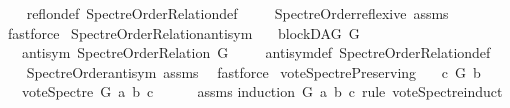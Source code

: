 \begin{isabellebody}
%
\isadelimproof
\ \ %
\endisadelimproof
%
\isatagproof
{}\isamarkupfalse%
\ refl{\isacharunderscore}{\kern0pt}on{\isacharunderscore}{\kern0pt}def\ Spectre{\isacharunderscore}{\kern0pt}Order{\isacharunderscore}{\kern0pt}Relation{\isacharunderscore}{\kern0pt}def\ \isanewline
\ \ \isamarkupfalse%
\ Spectre{\isacharunderscore}{\kern0pt}Order{\isacharunderscore}{\kern0pt}reflexive\ assms\ \isamarkupfalse%
\ fastforce%
\endisatagproof
{\isafoldproof}%
%
\isadelimproof
\isanewline
%
\endisadelimproof
\isanewline
{}\isamarkupfalse%
\ Spectre{\isacharunderscore}{\kern0pt}Order{\isacharunderscore}{\kern0pt}Relation{\isacharunderscore}{\kern0pt}antisym{\isacharcolon}{\kern0pt}\isanewline
\ \ \ {\isachardoublequoteopen}blockDAG\ G{\isachardoublequoteclose}\isanewline
\ \ \ {\isachardoublequoteopen}antisym\ {\isacharparenleft}{\kern0pt}Spectre{\isacharunderscore}{\kern0pt}Order{\isacharunderscore}{\kern0pt}Relation\ G{\isacharparenright}{\kern0pt}{\isachardoublequoteclose}\ \isanewline
%
\isadelimproof
\ \ %
\endisadelimproof
%
\isatagproof
{}\isamarkupfalse%
\ antisym{\isacharunderscore}{\kern0pt}def\ Spectre{\isacharunderscore}{\kern0pt}Order{\isacharunderscore}{\kern0pt}Relation{\isacharunderscore}{\kern0pt}def\ \isanewline
\ \ \isamarkupfalse%
\ Spectre{\isacharunderscore}{\kern0pt}Order{\isacharunderscore}{\kern0pt}antisym\ assms\ \isamarkupfalse%
\ fastforce%
\endisatagproof
{\isafoldproof}%
%
\isadelimproof
\isanewline
%
\endisadelimproof
\isanewline
\isanewline
{}\isamarkupfalse%
\ vote{\isacharunderscore}{\kern0pt}Spectre{\isacharunderscore}{\kern0pt}Preserving{\isacharcolon}{\kern0pt}\isanewline
\ \ \ {\isachardoublequoteopen}c\ {\isasymrightarrow}\isactrlsup {\isacharplus}{\kern0pt}\isactrlbsub G\isactrlesub \ b{\isachardoublequoteclose}\isanewline
\ \ \ {\isachardoublequoteopen}vote{\isacharunderscore}{\kern0pt}Spectre\ G\ a\ b\ c\ {\isasymin}\ {\isacharbraceleft}{\kern0pt}{}{\isacharcomma}{\kern0pt}{}{\isacharbraceright}{\kern0pt}{\isachardoublequoteclose}\isanewline
%
\isadelimproof
\ \ %
\endisadelimproof
%
\isatagproof
{}\isamarkupfalse%
\ assms\isanewline
{}\isamarkupfalse%
{\isacharparenleft}{\kern0pt}induction\ G\ a\ b\ c\ rule{\isacharcolon}{\kern0pt}\ vote{\isacharunderscore}{\kern0pt}Spectre{\isachardot}{\kern0pt}induct{\isacharparenright}{\kern0pt}\isanewline
\ \ \isamarkupfalse%

\end{isabellebody}

